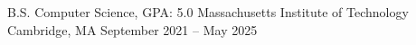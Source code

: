 \documentclass[12pt, letterpaper]{awesome-cv}
\begin{document}
\makecvheader

\begin{cventries}
  \cventry
    {B.S. Computer Science, GPA: 5.0} %
    {Massachusetts Institute of Technology} %
    {Cambridge, MA} %
    {September 2021 -- May 2025} %
    {
    }
  \vspace{-0.2in}
\end{cventries} 
\end{document}
